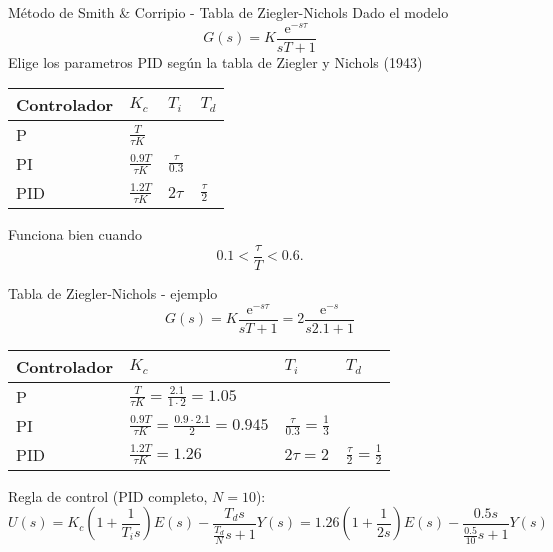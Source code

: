 \documentclass[presentation,aspectratio=1610]{beamer}
\begin{document}
\begin{frame}[label={sec:orgb936471}]{Método de Smith \& Corripio - Tabla de Ziegler-Nichols}
Dado el modelo 
\[ G(s) = K \frac{\mathrm{e}^{-s\tau}}{sT + 1} \]
Elige los parametros PID según la tabla de Ziegler y Nichols (1943)
   \begin{center}
   \setlength{\tabcolsep}{20pt}
   \renewcommand{\arraystretch}{1.5}
   \begin{tabular}{llll}
   Controlador & \(K_c\) & \(T_i\) & \(T_d\)\\
  \hline\hline
  P & \(\frac{T}{\tau K}\) &  & \\
  PI & \(\frac{0.9T}{\tau K}\) & \(\frac{\tau}{0.3}\) & \\
  PID & \(\frac{1.2T}{\tau K}\) & \(2\tau\) & \(\frac{\tau}{2}\)\\
  \hline
\end{tabular}
\end{center}

Funciona bien cuando \[0.1 < \frac{\tau}{T} < 0.6.\]
\end{frame}


\begin{frame}[label={sec:orga0a94a6}]{Tabla de  Ziegler-Nichols - ejemplo}
\[ G(s) = K \frac{\mathrm{e}^{-s\tau}}{sT + 1} = 2 \frac{\mathrm{e}^{-s}}{s2.1 + 1} \]
   \begin{center}
   \setlength{\tabcolsep}{20pt}
   \renewcommand{\arraystretch}{1.5}
   \begin{tabular}{llll}
   Controlador & \(K_c\) & \(T_i\) & \(T_d\)\\
  \hline\hline
  P & \(\frac{T}{\tau K} = \frac{2.1}{1 \cdot 2} = 1.05\) &  & \\
  PI & \(\frac{0.9T}{\tau K} = \frac{0.9\cdot 2.1}{2}= 0.945\) & \(\frac{\tau}{0.3} = \frac{1}{3} \) & \\
  PID & \(\frac{1.2T}{\tau K} = 1.26 \) & \(2\tau=2\) & \(\frac{\tau}{2}=\frac{1}{2}\)\\
  \hline
\end{tabular}
\end{center}
Regla de control (PID completo, \(N=10\)):
\[ U(s) = K_c\left( 1 + \frac{1}{T_i s} \right) E(s) - \frac{T_d s}{\frac{T_d}{N} s + 1}Y(s)
           =  1.26\left( 1 + \frac{1}{2 s} \right) E(s) - \frac{0.5s}{\frac{0.5}{10} s + 1}Y(s)\]
\end{frame}
\end{document}
